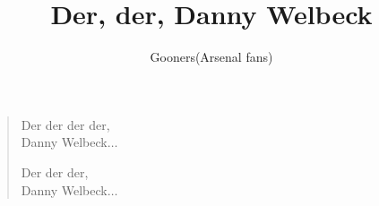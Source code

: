 \documentclass[a4paper,12pt]{article}
\title{Der, der, Danny Welbeck}
\author{Gooners(Arsenal fans)}
\date{}
\begin{document}
	
	\maketitle
	
	\begin{verse}
		
		Der der der der, \\
		Danny Welbeck$\ldots$\par
		Der der der, \\
		Danny Welbeck$\ldots$
		
	\end{verse}
	
\end{document}
